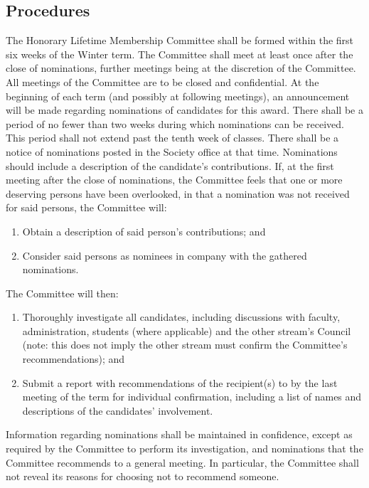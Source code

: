 \subsection{Procedures}
The Honorary Lifetime Membership Committee shall be formed within the first six weeks of the Winter term. The Committee shall meet at least once after the close of nominations, further meetings being at the discretion of the Committee. All meetings of the Committee are to be closed and confidential.
At the beginning of each term (and possibly at following meetings), an announcement will be made regarding nominations of candidates for this award.
There shall be a period of no fewer than two weeks during which nominations can be received. This period shall not extend past the tenth week of classes. There shall be a notice of nominations posted in the Society office at that time. Nominations should include a description of the candidate's contributions.
If, at the first meeting after the close of nominations, the Committee feels that one or more deserving persons have been overlooked, in that a nomination was not received for said persons, the Committee will:
\begin{enumerate}
\item Obtain a description of said person’s contributions; and
\item Consider said persons as nominees in company with the gathered nominations.
\end{enumerate}
The Committee will then:
\begin{enumerate}
\item Thoroughly investigate all candidates, including discussions with faculty, administration, students (where applicable) and the other stream's Council (note: this does not imply the other stream must confirm the Committee's recommendations); and
\item Submit a report with recommendations of the recipient(s) to  by the last meeting of the term for individual confirmation, including a list of names and descriptions of the candidates' involvement.
\end{enumerate}
Information regarding nominations shall be maintained in confidence, except as required by the Committee to perform its investigation, and nominations that the Committee recommends to a general meeting. In particular, the Committee shall not reveal its reasons for choosing not to recommend someone.

